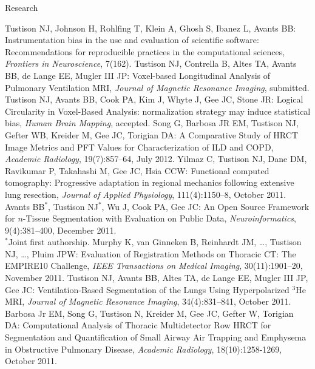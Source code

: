 \documentclass{resume}
\begin{document}

\begin{category}{Research}
   \begin{itemize}
    \citemnobullet Tustison NJ, Johnson H, Rohlfing T, Klein A, Ghosh S, Ibanez L, Avants BB: Instrumentation bias in the use and evaluation of scientific software: Recommendations for reproducible practices in the computational sciences, {\em Frontiers in Neuroscience}, 7(162).
    \citemnobullet Tustison NJ, Contrella B, Altes TA, Avants BB, de Lange EE, Mugler III JP: Voxel-based Longitudinal Analysis of Pulmonary Ventilation MRI, {\em Journal of Magnetic Resonance Imaging}, submitted.
    \citemnobullet Tustison NJ, Avants BB, Cook PA, Kim J, Whyte J, Gee JC, Stone JR: Logical Circularity in Voxel-Based Analysis:  normalization strategy may induce statistical bias, {\em Human Brain Mapping}, accepted.
    \citemnobullet Song G, Barbosa JR EM, Tustison NJ, Gefter WB, Kreider M, Gee JC, Torigian DA: A Comparative Study of HRCT Image Metrics and PFT Values for Characterization of ILD and COPD, {\em Academic Radiology}, 19(7):857--64, July 2012.
    \citemnobullet Yilmaz C, Tustison NJ, Dane DM, Ravikumar P, Takahashi M, Gee JC, Hsia CCW:  Functional computed tomography:  Progressive adaptation in regional mechanics following extensive lung resection, {\em Journal of Applied Physiology}, 111(4):1150--8, October 2011.
    \citemnobullet Avants BB$^*$, Tustison NJ$^*$, Wu J, Cook PA, Gee JC:  An Open Source Framework for $n$-Tissue Segmentation with Evaluation on Public Data, {\em Neuroinformatics}, 9(4):381--400, December 2011.\\
    $^*$Joint first authorship.
    \citemnobullet Murphy K, van Ginneken B, Reinhardt JM, \ldots, Tustison NJ, \ldots, Pluim JPW:  Evaluation of Registration Methods on Thoracic CT:  The EMPIRE10 Challenge,  {\em IEEE Transactions on Medical Imaging}, 30(11):1901--20, November 2011.
    \citemnobullet Tustison NJ, Avants BB, Altes TA, de Lange EE, Mugler III JP, Gee JC:  Ventilation-Based Segmentation of the Lungs Using Hyperpolarized $^3$He MRI, {\em Journal of Magnetic Resonance Imaging}, 34(4):831--841, October 2011.
    \citemnobullet Barbosa Jr EM, Song G, Tustison N, Kreider M, Gee JC, Gefter W, Torigian DA:  Computational Analysis of Thoracic Multidetector Row HRCT for Segmentation and Quantification of Small Airway Air Trapping and Emphysema in Obstructive Pulmonary Disease, {\em Academic Radiology}, 18(10):1258-1269, October 2011.

\end{itemize}
\end{category}
\end{document}
